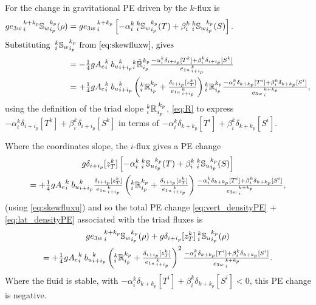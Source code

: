 \documentclass[../main/NEMO_manual]{subfiles}
\begin{document}
For the change in gravitational PE driven by the $k$-flux is
\begin{align}
  \label{eq:vert_densityPE}
  g {e_{3w}}_{\,i}^{\,k+k_p}{\mathbb{S}_w}_{i_p}^{k_p} (\rho)
  &=g {e_{3w}}_{\,i}^{\,k+k_p}\left[-\alpha _i^k {\:}_i^k
    {\mathbb{S}_w}_{i_p}^{k_p} (T) + \beta_i^k {\:}_i^k
    {\mathbb{S}_w}_{i_p}^{k_p} (S) \right]. \notag \\
  \intertext{Substituting  ${\:}_i^k {\mathbb{S}_w}_{i_p}^{k_p}$ from \autoref{eq:skewfluxw}, gives}
  &=-\quarter g{A_e}_i^k{\: }{b_u}_{i+i_p}^k {_i^k\tilde{\mathbb{R}}_{i_p}^{k_p}}
    \frac{ -\alpha _i^k\delta_{i+ i_p}[T^k]+ \beta_i^k\delta_{i+ i_p}[S^k]} { {e_{1u}}_{\,i + i_p}^{\,k} } \notag \\
  &=+\quarter g{A_e}_i^k{\: }{b_u}_{i+i_p}^k
    \left({_i^k\mathbb{R}_{i_p}^{k_p}}+\frac{\delta_{i+i_p}[z_T^k]}{{e_{1u}}_{\,i + i_p}^{\,k}}\right) {_i^k\mathbb{R}_{i_p}^{k_p}}
    \frac{-\alpha_i^k \delta_{k+ k_p}[T^i]+ \beta_i^k\delta_{k+ k_p}[S^i]} {{e_{3w}}_{\,i}^{\,k+k_p}},
\end{align}
using the definition of the triad slope ${}_{i}^{k}{\mathbb{R}_{}}_{i_p}^{\,k_p}$, \autoref{eq:R} to
express $-\alpha _i^k\delta_{i+ i_p}[T^k]+\beta_i^k\delta_{i+ i_p}[S^k]$ in terms of
$-\alpha_i^k \delta_{k+ k_p}[T^i]+ \beta_i^k\delta_{k+ k_p}[S^i]$.

Where the coordinates slope, the $i$-flux gives a PE change
\begin{multline}
  \label{eq:lat_densityPE}
  g \delta_{i+i_p}[z_T^k]
  \left[
    -\alpha _i^k {\:}_i^k {\mathbb{S}_u}_{i_p}^{k_p} (T) + \beta_i^k {\:}_i^k {\mathbb{S}_u}_{i_p}^{k_p} (S)
  \right] \\
  = +\textstyle\frac{1}{4} g{A_e}_i^k{\: }{b_u}_{i+i_p}^k
  \frac{\delta_{i+i_p}[z_T^k]}{{e_{1u}}_{\,i + i_p}^{\,k}}
  \left({_i^k\mathbb{R}_{i_p}^{k_p}}+\frac{\delta_{i+i_p}[z_T^k]}{{e_{1u}}_{\,i + i_p}^{\,k}}\right)
  \frac{-\alpha_i^k \delta_{k+ k_p}[T^i]+ \beta_i^k\delta_{k+ k_p}[S^i]} {{e_{3w}}_{\,i}^{\,k+k_p}},
\end{multline}
(using \autoref{eq:skewfluxu}) and so the total PE change \autoref{eq:vert_densityPE} +
\autoref{eq:lat_densityPE} associated with the triad fluxes is
\begin{multline*}
  g{e_{3w}}_{\,i}^{\,k+k_p}{\mathbb{S}_w}_{i_p}^{k_p} (\rho) +
  g\delta_{i+i_p}[z_T^k] {\:}_i^k {\mathbb{S}_u}_{i_p}^{k_p} (\rho) \\
  = +\textstyle\frac{1}{4} g{A_e}_i^k{\: }{b_u}_{i+i_p}^k
  \left({_i^k\mathbb{R}_{i_p}^{k_p}}+\frac{\delta_{i+i_p}[z_T^k]}{{e_{1u}}_{\,i + i_p}^{\,k}}\right)^2
  \frac{-\alpha_i^k \delta_{k+ k_p}[T^i]+ \beta_i^k\delta_{k+ k_p}[S^i]} {{e_{3w}}_{\,i}^{\,k+k_p}}.
\end{multline*}
Where the fluid is stable, with $-\alpha_i^k \delta_{k+ k_p}[T^i]+
\beta_i^k\delta_{k+ k_p}[S^i]<0$, this PE change is negative.
\end{document}
